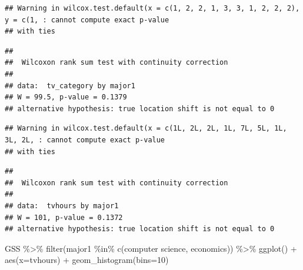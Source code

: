 \documentclass[
]{book}
\newenvironment{Shaded}{\begin{snugshade}}{\end{snugshade}}
\newcommand{\AttributeTok}[1]{\textcolor[rgb]{0.77,0.63,0.00}{#1}}
\newcommand{\DecValTok}[1]{\textcolor[rgb]{0.00,0.00,0.81}{#1}}
\newcommand{\FunctionTok}[1]{\textcolor[rgb]{0.00,0.00,0.00}{#1}}
\newcommand{\NormalTok}[1]{#1}
\newcommand{\SpecialCharTok}[1]{\textcolor[rgb]{0.00,0.00,0.00}{#1}}
\newcommand{\StringTok}[1]{\textcolor[rgb]{0.31,0.60,0.02}{#1}}
\theoremstyle{definition}
\theoremstyle{definition}
\theoremstyle{definition}
\theoremstyle{definition}
\theoremstyle{remark}
\begin{document}
\begin{verbatim}
## Warning in wilcox.test.default(x = c(1, 2, 2, 1, 3, 3, 1, 2, 2, 2), y = c(1, : cannot compute exact p-value
## with ties
\end{verbatim}

\begin{verbatim}
## 
##  Wilcoxon rank sum test with continuity correction
## 
## data:  tv_category by major1
## W = 99.5, p-value = 0.1379
## alternative hypothesis: true location shift is not equal to 0
\end{verbatim}

\begin{Shaded}
\end{Shaded}

\begin{verbatim}
## Warning in wilcox.test.default(x = c(1L, 2L, 2L, 1L, 7L, 5L, 1L, 3L, 2L, : cannot compute exact p-value
## with ties
\end{verbatim}

\begin{verbatim}
## 
##  Wilcoxon rank sum test with continuity correction
## 
## data:  tvhours by major1
## W = 101, p-value = 0.1372
## alternative hypothesis: true location shift is not equal to 0
\end{verbatim}

\begin{Shaded}
\begin{Highlighting}[]
\NormalTok{GSS }\SpecialCharTok{\%\textgreater{}\%} 
  \FunctionTok{filter}\NormalTok{(major1 }\SpecialCharTok{\%in\%} \FunctionTok{c}\NormalTok{(}\StringTok{\textquotesingle{}computer science\textquotesingle{}}\NormalTok{, }\StringTok{\textquotesingle{}economics\textquotesingle{}}\NormalTok{)) }\SpecialCharTok{\%\textgreater{}\%} 
  \FunctionTok{ggplot}\NormalTok{() }\SpecialCharTok{+} 
  \FunctionTok{aes}\NormalTok{(}\AttributeTok{x=}\NormalTok{tvhours) }\SpecialCharTok{+} 
  \FunctionTok{geom\_histogram}\NormalTok{(}\AttributeTok{bins=}\DecValTok{10}\NormalTok{)}
\end{Highlighting}
\end{Shaded}
\end{document}
